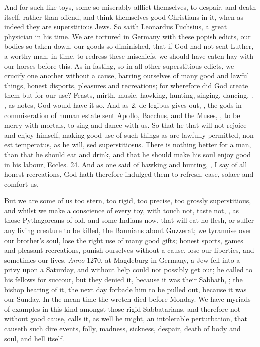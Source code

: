 {And for such like toys, some so miserably afflict themselves, to
despair, and death itself, rather than offend, and think themselves
good Christians in it, when as indeed they are superstitious Jews. So
saith Leonardus Fuchsius, a great physician in his time. We are
tortured in Germany with these popish edicts, our bodies so taken down,
our goods so diminished, that if God had not sent Luther, a worthy man,
in time, to redress these mischiefs, we should have eaten hay with our
horses before this. As in fasting, so in all other superstitious
edicts, we crucify one another without a cause, barring ourselves of
many good and lawful things, honest disports, pleasures and
recreations; for wherefore did God create them but for our use? Feasts,
mirth, music, hawking, hunting, singing, dancing, \etc{}. , as \Seneca
notes, God would have it so. And as \Plato \textlatin{2. de legibus} gives out, , the gods in commiseration of human
estate sent Apollo, Bacchus, and the Muses, , to be merry with mortals, to sing and
dance with us. So that he that will not rejoice and enjoy himself,
making good use of such things as are lawfully permitted, non est
temperatus, as he will, sed superstitiosus. There is nothing better for
a man, than that he should eat and drink, and that he should make his
soul enjoy good in his labour, Eccles.  24. And as one said of
hawking and hunting, , I say of all honest recreations, God
hath therefore indulged them to refresh, ease, solace and comfort us.

But we are some of us too stern, too rigid, too precise, too grossly
superstitious, and whilst we make a conscience of every toy, with touch
not, taste not, \etc{}, as those Pythagoreans of old, and some Indians
now, that will eat no flesh, or suffer any living creature to be
killed, the Bannians about Guzzerat; we tyrannise over our brother's
soul, lose the right use of many good gifts; honest sports, games
and pleasant recreations, punish ourselves without a cause, lose
our liberties, and sometimes our lives. \emph{Anno} 1270, at Magdeburg
in Germany, a Jew fell into a privy upon a Saturday, and without help
could not possibly get out; he called to his fellows for succour, but
they denied it, because it was their Sabbath, ; the bishop hearing of it, the next day forbade him to be
pulled out, because it was our Sunday. In the mean time the wretch died
before Monday. We have myriads of examples in this kind amongst those
rigid Sabbatarians, and therefore not without good cause,
 \Seneca calls it, as well he might, an
intolerable perturbation, that causeth such dire events, folly,
madness, sickness, despair, death of body and soul, and hell itself.

}
